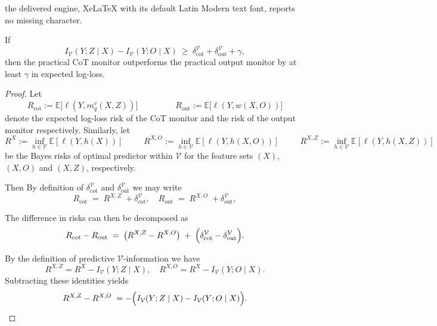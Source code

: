 \documentclass[10pt,a4paper]{amsart}
\newcommand{\IV}{I_\mathcal{V}}
\newcommand{\V}{\mathcal{V}}
\begin{document}
the delivered engine, XeLaTeX with its default Latin Modern text font, reports no missing character.
\begin{proposition}
If
\[
\IV(Y;Z\mid X)-\IV(Y;O\mid X)\ \ge\ \delta^{\V}_{\text{cot}}+\delta^{\V}_{\text{out}}+\gamma,
\]
then the practical CoT monitor outperforms the practical output monitor by at least $\gamma$ in expected log-loss.
\end{proposition}

\begin{proof}
Let
\[
R_{\mathrm{cot}}:=\mathbb{E}\big[\ell(Y,m_{q}^{v}(X,Z))\big]
\qquad \;\ \qquad
R_{\mathrm{out}}:=\mathbb{E}\big[\ell(Y,w(X,O))\big]
\]
denote the expected log-loss risk of the CoT monitor and the risk of the output monitor respectively. 
Similarly, let
\[
R^{X}:=\inf_{h\in \mathcal{V}}\mathbb{E}[\ell(Y,h(X))] \quad \;\ \quad
R^{X,O}:=\inf_{h\in \mathcal{V}}\mathbb{E}[\ell(Y,h(X,O))] \quad \;\ \quad
R^{X,Z}:=\inf_{h\in \mathcal{V}}\mathbb{E}[\ell(Y,h(X,Z))] 
\]
be the Bayes risks of optimal predictor within $\mathcal{V}$ for the feature sets $(X)$, $(X,O)$ and $(X,Z)$, respectively.

Then By definition of $\delta^{\mathcal{V}}_{\mathrm{cot}}$ and $\delta^{\mathcal{V}}_{\mathrm{out}}$ we may write
\[
R_{\mathrm{cot}}\;=\;R^{X,Z}\;+\delta^{\mathcal{V}}_{\mathrm{cot}},
\quad
R_{\mathrm{out}}\;=\;R^{X,O}\;+\delta^{\mathcal{V}}_{\mathrm{out}},
\]

The difference in risks can then be decomposed as
\begin{align}
\label{eq:theorem-v-information-1}    
R_{\mathrm{cot}}-R_{\mathrm{out}}
\;=\;\bigl(R^{X,Z}-R^{X,O}\bigr)
\;+\;
\Bigl(\delta^{\mathcal{V}}_{\mathrm{cot}}-\delta^{\mathcal{V}}_{\mathrm{out}}\Bigr).
\end{align}

By the definition of predictive $\mathcal{V}$-information we have
\[
R^{X,Z}=R^{X}-I_{\mathcal{V}}(Y;Z\mid X),
\quad
R^{X,O}=R^{X}-I_{\mathcal{V}}(Y;O\mid X).
\]
Subtracting these identities yields
\begin{align}
\label{eq:theorem-v-information-2}    
R^{X,Z}-R^{X,O}
\;=-\Bigl(I_{\mathcal{V}}(Y;Z\mid X)-I_{\mathcal{V}}(Y;O\mid X)\Bigr).
\end{align}


\end{proof}
\end{document}
